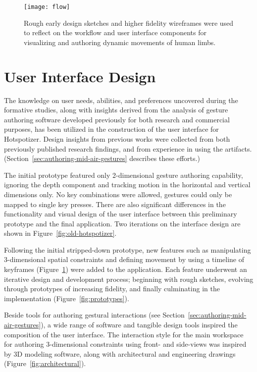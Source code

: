 \begin{figure}[t]
\centering
\texttt{[image: flow]}
\caption{Rough early design sketches and higher fidelity wireframes were used to reflect on the workflow and user interface components for visualizing and authoring dynamic movements of human limbs.}
\label{fig:flow}
\end{figure}

\section{User Interface Design}
\label{sec:user-interface-design}

The knowledge on user needs, abilities, and preferences uncovered during the formative studies, along with insights derived from the analysis of gesture authoring software developed previously for both research and commercial purposes, has been utilized in the construction of the user interface for Hotspotizer. Design insights from previous works were collected from both previously published research findings, and from experience in using the artifacts. (Section~\ref{sec:authoring-mid-air-gestures} describes these efforts.)

The initial prototype featured only 2-dimensional gesture authoring capability, ignoring the depth component and tracking motion in the horizontal and vertical dimensions only. No key combinations were allowed, gestures could only be mapped to single key presses. There are also significant differences in the functionality and visual design of the user interface between this preliminary prototype and the final application. Two iterations on the interface design are shown in Figure~\ref{fig:old-hotspotizer}.

Following the initial stripped-down prototype, new features such as manipulating 3-dimensional spatial constraints and defining movement by using a timeline of keyframes (Figure~\ref{fig:flow}) were added to the application. Each feature underwent an iterative design and development process; beginning with rough sketches, evolving through prototypes of increasing fidelity, and finally culminating in the implementation (Figure~\ref{fig:prototypes}).

Beside tools for authoring gestural interactions (see Section~\ref{sec:authoring-mid-air-gestures}), a wide range of software and tangible design tools inspired the composition of the user interface. The interaction style for the main workspace for authoring 3-dimensional constraints using front- and side-views was inspired by 3D modeling software, along with architectural and engineering drawings (Figure~\ref{fig:architectural}).

